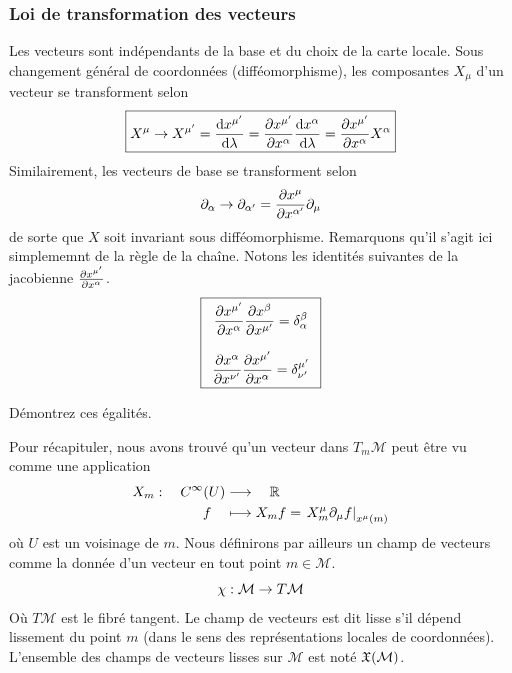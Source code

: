 \subsubsection{Loi de transformation des vecteurs}
Les vecteurs sont indépendants de la base et du choix de la carte locale. Sous changement général de coordonnées (difféomorphisme), les composantes $X_\mu$ d'un vecteur se transforment selon
    \begin{align}
        \boxed{X^\mu \to X^{\mu'} = \frac{\mathrm{d} x^{\mu'}}{\mathrm{d} \lambda} = \frac{\partial x^{\mu'}}{\partial x^\alpha} \frac{\mathrm{d} x^\alpha}{\mathrm{d} \lambda} = \frac{\partial x^{\mu'}}{\partial x^\alpha} X^\alpha}
    \end{align}
Similairement, les vecteurs de base se transforment selon
\begin{equation}
    \partial_\alpha \to \partial_{\alpha'} = \frac{\partial x^\mu}{\partial x^{\alpha'}} \partial_\mu
\end{equation}
de sorte que $X$ soit invariant sous difféomorphisme. Remarquons qu'il s'agit ici simplememnt de la règle de la chaîne. Notons les identités suivantes de la jacobienne $\frac{\partial x^{\mu'}}{\partial x^\alpha}$.
\begin{align}
    \label{eq: id chgmt de coordonnées}
    \boxed{
        \begin{array}{c}
            \dfrac{\pd x^{\mu'}}{\pd x^\alpha}\dfrac{\pd x^{\beta}}{\pd x^{\mu'}} = \displaystyle \delta^\beta_\alpha  \\
            \\
            \dfrac{\pd x^{\alpha}}{\pd x^{\nu'}}\dfrac{\pd x^{\mu'}}{\pd x^\alpha} =\displaystyle\delta\indices*{^{\mu'}_{\nu'}}
        \end{array} 
    }
\end{align}
\begin{exerc}
    Démontrez ces égalités.
\end{exerc}
Pour récapituler, nous avons trouvé qu'un vecteur dans $T_m\mathcal{M}$ peut être vu comme une application
\begin{align}
    X_m : \quad C^\infty(U) &\longrightarrow \quad\mathbb{R}\\
    f \quad&\longmapsto X_m f = \left. X^\mu_m \partial_\mu f \right|_{x^\mu(m)}
\end{align}
où $U$ est un voisinage de $m$. Nous définirons par ailleurs un champ de vecteurs comme la donnée d'un vecteur en tout point $m \in \mathcal{M}$.
\begin{equation}
    \chi: \mathcal{M} \to T\mathcal{M}
\end{equation}
Où $T\mathcal{M}$ est le fibré tangent. Le champ de vecteurs est dit lisse s'il dépend lissement du point $m$ (dans le sens des représentations locales de coordonnées). L'ensemble des champs de vecteurs lisses sur $\mathcal{M}$ est noté $ \mathfrak{X} (\mathcal{M})$.

